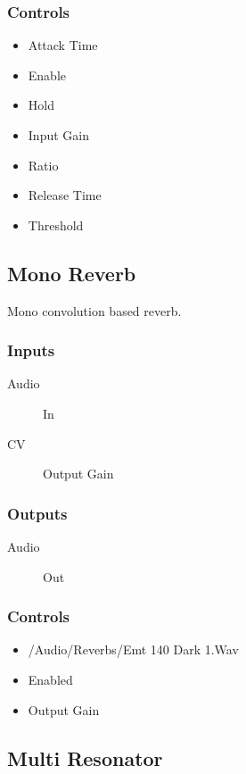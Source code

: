 \subsubsection{Controls}
\begin{itemize}
\item Attack Time
\item Enable
\item Hold
\item Input Gain
\item Ratio
\item Release Time
\item Threshold
\end{itemize}

\subsection{Mono Reverb}

Mono convolution based reverb.



\subsubsection{Inputs}
\begin{description}
\item [Audio] In
\item [CV] Output Gain
\end{description}

\subsubsection{Outputs}
\begin{description}
\item [Audio] Out
\end{description}

\subsubsection{Controls}
\begin{itemize}
\item /Audio/Reverbs/Emt 140 Dark 1.Wav
\item Enabled
\item Output Gain
\end{itemize}

\subsection{Multi Resonator}

